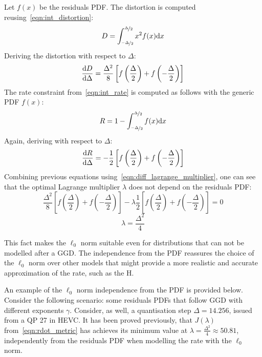 \documentclass[11pt,a4paper,openright,twoside]{book}
\numberwithin{equation}{section} %
\numberwithin{figure}{section} %
\numberwithin{table}{section} %
\begin{document}
Let $f(x)$ be the residuals \ac{PDF}.
The distortion is computed reusing~\eqref{eqn:int_distortion}:
\begin{equation}
	D = \int_{\nicefrac{-\Delta}{2}}^{\nicefrac{\Delta}{2}} x^2 f(x) \text{d} x
\end{equation}
Deriving the distortion with respect to $\Delta$:
\begin{equation}
	\frac{\text{d} D}{\text{d} \Delta} =
	\frac{\Delta^2}{8}\left[
	f\left(\frac{\Delta}{2}\right)+f\left(-\frac{\Delta}{2}\right)\right]
\end{equation}
The rate constraint from~\eqref{eqn:int_rate} is computed as
follows with the generic \ac{PDF}
$f(x)$:
\begin{equation}
	R = 1 - \int_{\nicefrac{-\Delta}{2}}^{\nicefrac{\Delta}{2}} f(x) \text{d} x\\
\end{equation}
Again, deriving with respect to $\Delta$:
\begin{equation}
	\frac{\text{d} R}{\text{d} \Delta} =
	-\frac{1}{2}\left[
	f\left(\frac{\Delta}{2}\right)+
	f\left(-\frac{\Delta}{2}\right)\right]
\end{equation}
Combining previous equations using~\eqref{eqn:diff_lagrange_multiplier},
one can see that the optimal Lagrange multiplier $\lambda$ does not
depend on the residuals \ac{PDF}:
\begin{equation}
	\frac{\Delta^2}{8}\left[
	f\left(\frac{\Delta}{2}\right)+f\left(-\frac{\Delta}{2}\right)\right]
	- \lambda
	\frac{1}{2}\left[
	f\left(\frac{\Delta}{2}\right)+
	f\left(-\frac{\Delta}{2}\right)\right] = 0
\end{equation}
\begin{equation}
	\boxed{\lambda = \frac{\Delta^2}{4}}
\end{equation}

This fact makes the $\ell_0$ norm suitable even for distributions
that can not be modelled after a \ac{GGD}.
The independence from the \ac{PDF} reassures the choice of the $\ell_0$
norm over other models that might provide a more realistic and accurate
approximation of the rate, such as the \ac{H}.

An example of the $\ell_0$ norm independence from the \ac{PDF} is provided
below.
Consider the following scenario: some residuals \acp{PDF} that follow
\ac{GGD} with different exponents $\gamma$.
Consider, as well, a quantisation step $\Delta=14.256$, issued from a
\ac{QP} 27 in \ac{HEVC}.
It has been proved previously, that $J(\lambda)$
from~\eqref{eqn:rdot_metric} has achieves its minimum value at
$\lambda=\frac{\Delta^2}{4}\approx50.81$, independently from the
residuals \ac{PDF} when modelling the rate with the $\ell_0$ norm.
\end{document}
